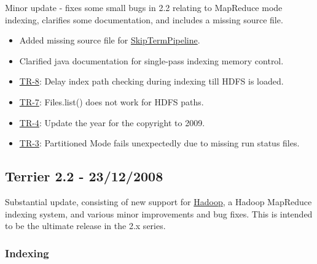 Minor update - fixes some small bugs in 2.2 relating to MapReduce mode
indexing, clarifies some documentation, and includes a missing source
file.

\begin{itemize}
\tightlist
\item
  Added missing source file for
  \href{javadoc/org/terrier/terms/SkipTermPipeline.html}{SkipTermPipeline}.
\item
  Clarified java documentation for single-pass indexing memory control.
\item
  \href{http://terrier.org/issues/browse/TR-8}{TR-8}: Delay index path
  checking during indexing till HDFS is loaded.
\item
  \href{http://terrier.org/issues/browse/TR-7}{TR-7}: Files.list() does
  not work for HDFS paths.
\item
  \href{http://terrier.org/issues/browse/TR-4}{TR-4}: Update the year
  for the copyright to 2009.
\item
  \href{http://terrier.org/issues/browse/TR-3}{TR-3}: Partitioned Mode
  fails unexpectedly due to missing run status files.
\end{itemize}

\subsection{Terrier 2.2 - 23/12/2008}\label{terrier-2.2---23122008}

Substantial update, consisting of new support for
\href{http://hadoop.apache.org/core/}{Hadoop}, a Hadoop MapReduce
indexing system, and various minor improvements and bug fixes. This is
intended to be the ultimate release in the 2.x series.

\subsubsection{Indexing}\label{indexing-5}

